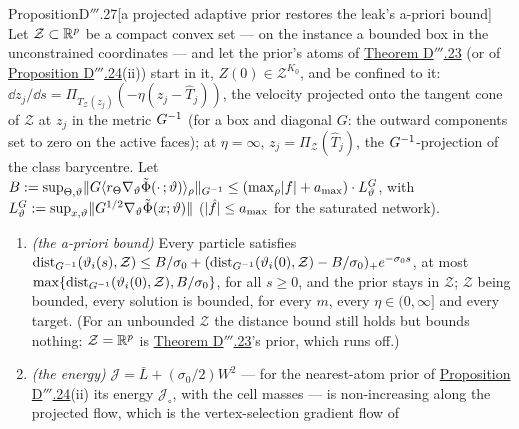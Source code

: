 \begin{thm}{Proposition}{D$'''$.27}[a projected adaptive prior restores the leak's a-priori
bound]\label{res:thmDppp:27}%
Let $\mathcal{Z}\subset\mathbb{R}^p$ be a compact convex set --- on the instance a bounded box in the unconstrained
coordinates --- and let the prior's atoms of \hyperref[res:thmDppp:23]{Theorem D$'''$.23} (or of
\hyperref[res:thmDppp:24]{Proposition D$'''$.24}(ii)) start in it, $Z(0)\in\mathcal{Z}^{K_0}$, and be confined to it:
$\dd z_j/\dd s = \Pi_{T_{\mathcal{Z}}(z_j)}(-\eta(z_j - \hat T_j))$, the velocity projected onto the tangent cone of
$\mathcal{Z}$ at $z_j$ in the metric $G^{-1}$ (for a box and diagonal $G$: the outward components set to zero on the
active faces); at $\eta = \infty$, $z_j = \Pi_{\mathcal{Z}}(\hat T_j)$, the $G^{-1}$-projection of the class
barycentre. Let
$B := \sup_{\Theta,\vartheta}\lVert G\langle r_\Theta\nabla_\vartheta\tilde\Phi(\cdot\,;\vartheta)\rangle_\rho\rVert_{G^{-1}}
\le(\max_\rho\lvert f\rvert + a_{\max})\cdot L_\vartheta^G$, with
$L_\vartheta^G := \sup_{x,\vartheta}\lVert G^{1/2}\nabla_\vartheta\tilde\Phi(x;\vartheta)\rVert$ ($\lvert \hat f\rvert\le a_{\max}$
for the saturated network).
\begin{enumerate}[label=\textup{(\roman*)}]
  \item \emph{(the a-priori bound)} Every particle satisfies
    $\operatorname{dist}_{G^{-1}}(\vartheta_i(s),\mathcal{Z})\le B/\sigma_0
    + (\operatorname{dist}_{G^{-1}}(\vartheta_i(0),\mathcal{Z}) - B/\sigma_0)_+e^{-\sigma_0s}$, at most
    $\max\{\operatorname{dist}_{G^{-1}}(\vartheta_i(0),\mathcal{Z}),B/\sigma_0\}$, for all $s\ge0$, and the prior stays
    in $\mathcal{Z}$; $\mathcal{Z}$ being bounded, every solution is bounded, for every $m$, every
    $\eta\in(0,\infty]$ and every target. (For an unbounded $\mathcal{Z}$ the distance bound still holds but bounds
    nothing: $\mathcal{Z} = \mathbb{R}^p$ is \hyperref[res:thmDppp:23]{Theorem D$'''$.23}'s prior, which runs off.)
  \item \emph{(the energy)} $\mathcal{J} = \bar L + (\sigma_0/2)W^2$ --- for the nearest-atom prior of
    \hyperref[res:thmDppp:24]{Proposition D$'''$.24}(ii) its energy $\mathcal{J}_\circ$, with the cell masses --- is
    non-increasing along the projected flow, which is the vertex-selection gradient flow of

\end{enumerate}
\end{thm}
